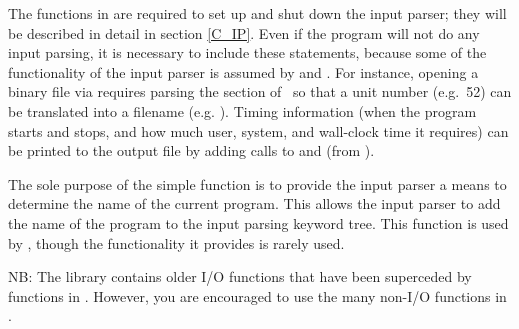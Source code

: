 The functions in  are required to set up and shut down
the input parser; they will be described in detail in section
\ref{C_IP}.  Even if the program will not do any input parsing, it is
necessary to include these statements, because some of the
functionality of the input parser is assumed by 
and .  For instance, opening a binary file via
 requires parsing the  section of
\ so that a unit number (e.g.~52) can be translated into a
filename (e.g. ).  Timing information (when the program
starts and stops, and how much user, system, and wall-clock time it
requires) can be printed to the output file by adding calls to
 and  (from ).

The sole purpose of the simple function  is to provide
the input parser a means to determine the name of the current program.
This allows the input parser to add the name of the program to the
input parsing keyword tree.  This function is used by
, though the functionality it provides is rarely
used.

NB: The library  contains older I/O functions that
have been superceded by functions in .  However,
you are encouraged to use the many non-I/O functions in
.
